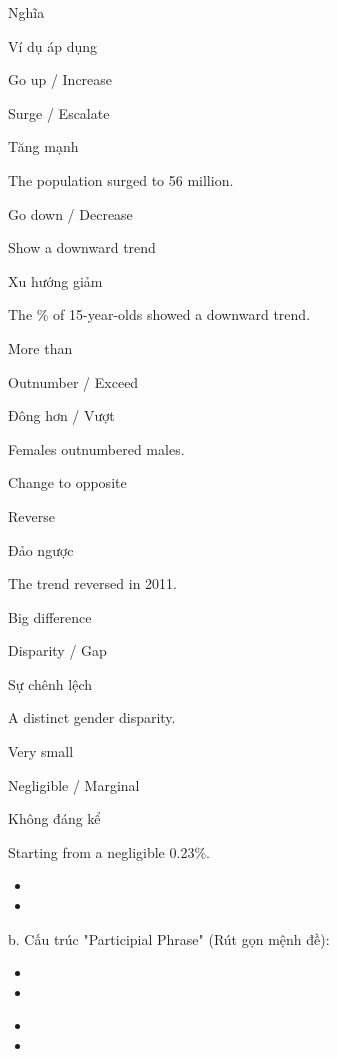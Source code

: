 \documentclass{../templateWriting/cdwriting}
\begin{document}
Nghĩa

Ví dụ áp dụng

Go up / Increase

Surge / Escalate

Tăng mạnh

The population surged to 56 million.

Go down / Decrease

Show a downward trend

Xu hướng giảm

The \% of 15-year-olds showed a downward trend.

More than

Outnumber / Exceed

Đông hơn / Vượt

Females outnumbered males.

Change to opposite

Reverse

Đảo ngược

The trend reversed in 2011.

Big difference

Disparity / Gap

Sự chênh lệch

A distinct gender disparity.

Very small

Negligible / Marginal

Không đáng kể

Starting from a negligible 0.23\%.


\begin{itemize}
\item {}
\item {}
\end{itemize}

b. Cấu trúc "Participial Phrase" (Rút gọn mệnh đề):
\begin{itemize}
\item {}
\item {}
\end{itemize}

\begin{itemize}
\item {}
\item {}
\end{itemize}
\end{document}
